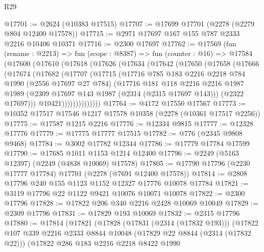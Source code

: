 \begin{lexlean}{R29}
\begin{coremodule}
@17701 := @2624 (@10383 @17515)
@17707 := @17699 @17701 (@2278 (@2279 @804 @12400 @17578))
@17715 := @2971 @17697 @167 @155 @787 @2333 @2216 @10406 @10371
@17716 := @2300 @17697
@17762 := @17569
    (fun (rename : @2213) =>
    fun (scope : @8387) =>
    fun (counter : @16) =>
    @17584
      (@17600
        (@17610
          (@17618
            (@17626
              (@17634
                (@17642
                  (@17650
                    (@17658
                      (@17666
                        (@17674
                          (@17682
                            (@17707
                              (@17715
                                (@17716
                                  @785
                                  @183
                                  @2216
                                  @2218
                                  @784
                                  @1990
                                  (@2556 @17697 @27 @784)
                                  (@17716
                                    @181
                                    @118
                                    @2216
                                    @2216
                                    @1987
                                    @1989
                                    (@2309 @17697 @143 @1987 (@2314 (@2315 @17697 @143)))
                                    (@2322 @17697)))
                                @10421))))))))))))))
@17764 := @4172 @17550 @17567
@17773 := @10352 @17517 @17546 @1217 @17578 @10358 (@2278 (@10361 @17517 @2256))
@17775 := @17587 @1215 @2216
@17776 := @12334 @9815
@17777 := @12328 @17776
@17779 := @17775 @17777 @17515
@17782 := @776 (@2345 @9808 @9468)
@17784 := @3002 @17782 @12344
@17786 := @17779 @17784 @17599
@17790 := @17685 @1011 @1153 @1214 @12400
@17796 := @2249 (@5163 @12397) (@2249 (@4838 @10069) @17578)
@17805 := @17790 @17796 (@2230 @17777 @17784) @17701 (@2278 (@7691 @12400 @17578))
@17814 := @2808 @17796 @240 @155 @1123 @1152 @12327 @17776 @10078 @17784
@17821 := @3119 @17796 @22 @1122 @9421 @10076 @10071 @10078
@17822 := @2300 @17796
@17828 := @17822 @206 @340 @2216 @2428 @10069 @10049
@17829 := @2309 @17796
@17831 := @17829 @193 @10069
@17832 := @2315 @17796
@17880 := @17814
    (@17821
      (@17828
        (@17831 (@2314 (@17832 @193)))
        (@17822
          @107
          @339
          @2216
          @2333
          @8844
          @10048
          (@17829 @22 @8844 (@2314 (@17832 @22)))
          (@17822
            @286
            @183
            @2216
            @2218
            @8422
            @1990

\end{coremodule}
\end{lexlean}

